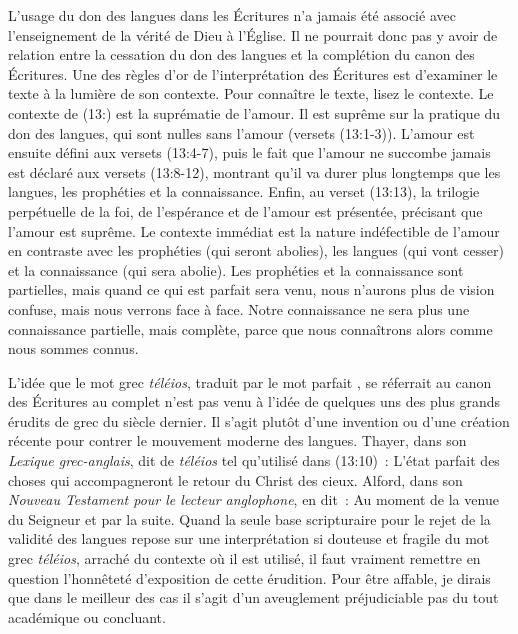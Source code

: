 L'usage du don des langues dans les Écritures n'a jamais été associé
 avec l'enseignement de la vérité de Dieu à l'Église.
 Il ne pourrait donc pas y avoir de relation entre la cessation
 du don des langues et la complétion du canon des Écritures.
 Une des règles d'or de l'interprétation des Écritures est d'examiner
 le texte à la lumière de son contexte. Pour connaître le texte,
 lisez le contexte. Le contexte de (13:) est la suprématie
 de l'amour. Il est suprême sur la pratique du don des langues,
 qui sont nulles sans l'amour (versets (13:1-3)).
 L'amour est ensuite défini aux versets (13:4-7),
 puis le fait que l'amour ne succombe jamais est déclaré aux versets
 (13:8-12), montrant qu'il va durer plus longtemps
 que les langues, les prophéties et la connaissance.
 Enfin, au verset (13:13), la trilogie perpétuelle de la foi,
 de l'espérance et de l'amour est présentée, précisant que l'amour
 est suprême. Le contexte immédiat est la nature indéfectible de l'amour
 en contraste avec les prophéties (qui seront abolies), les langues
 (qui vont cesser) et la connaissance (qui sera abolie).
 Les prophéties et la connaissance sont partielles, mais quand ce qui
 est parfait sera venu, nous n'aurons plus de vision confuse,
 mais nous verrons face à face. Notre connaissance ne sera plus
 une connaissance partielle, mais complète, parce que nous connaîtrons
 alors comme nous sommes connus.

L'idée que le mot grec \emph{téléios}, traduit par le mot \og parfait \fg{},
 se réferrait au canon des Écritures au complet n'est pas venu
 à l'idée de quelques uns des plus grands érudits de grec du siècle dernier.
 Il s'agit plutôt d'une invention ou d'une création récente pour contrer
 le mouvement moderne des langues. Thayer, dans son
 \emph{Lexique grec-anglais},
 dit de \emph{téléios} tel qu'utilisé dans (13:10)~:
 \og L'état parfait des choses qui accompagneront le retour du Christ
 des cieux. \fg{} Alford, dans son \emph{Nouveau Testament pour le lecteur
 anglophone}, en dit~: \og Au moment de la venue du Seigneur et par la suite. \fg{}
 Quand la seule base scripturaire pour le rejet de la validité des langues
 repose sur une interprétation si douteuse et fragile du mot grec
 \emph{téléios}, arraché du contexte où il est utilisé, il faut vraiment
 remettre en question l'honnêteté d'exposition de cette érudition.
 Pour être affable, je dirais que dans le meilleur des cas il s'agit
 d'un aveuglement préjudiciable \ocadr pas du tout académique ou concluant.

